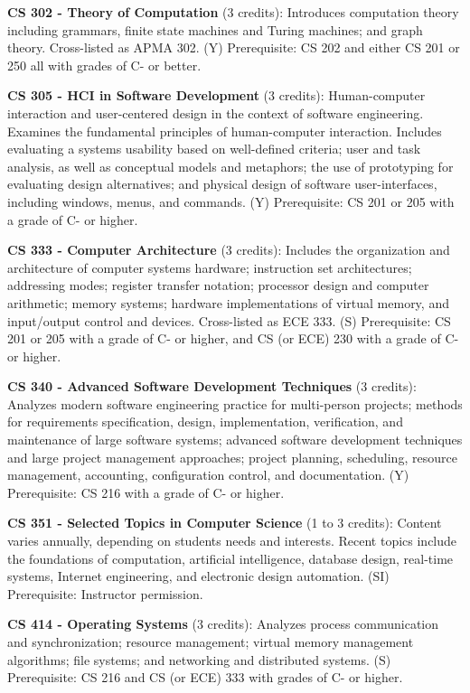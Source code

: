 \documentclass[12pt,twoside]{article}
\begin{document}
{\bf\noindent CS 302 - Theory of Computation} (3 credits): Introduces
computation theory including grammars, finite state machines and
Turing machines; and graph theory. Cross-listed as APMA 302. (Y)
Prerequisite: CS 202 and either CS 201 or 250 all with grades of C- or
better.

{\bf\noindent CS 305 - HCI in Software Development} (3 credits):
Human-computer interaction and user-centered design in the context of
software engineering. Examines the fundamental principles of
human-computer interaction. Includes evaluating a systems usability
based on well-defined criteria; user and task analysis, as well as
conceptual models and metaphors; the use of prototyping for evaluating
design alternatives; and physical design of software user-interfaces,
including windows, menus, and commands. (Y) Prerequisite: CS 201 or
205 with a grade of C- or higher.

{\bf\noindent CS 333 - Computer Architecture} (3 credits): Includes
the organization and architecture of computer systems hardware;
instruction set architectures; addressing modes; register transfer
notation; processor design and computer arithmetic; memory systems;
hardware implementations of virtual memory, and input/output control
and devices. Cross-listed as ECE 333. (S) Prerequisite: CS 201 or 205
with a grade of C- or higher, and CS (or ECE) 230 with a grade of C-
or higher.
     
{\bf\noindent CS 340 - Advanced Software Development Techniques} (3
credits): Analyzes modern software engineering practice for
multi-person projects; methods for requirements specification, design,
implementation, verification, and maintenance of large software
systems; advanced software development techniques and large project
management approaches; project planning, scheduling, resource
management, accounting, configuration control, and documentation. (Y)
Prerequisite: CS 216 with a grade of C- or higher.

{\bf\noindent CS 351 - Selected Topics in Computer Science} (1 to 3
credits): Content varies annually, depending on students needs
and interests. Recent topics include the foundations of computation,
artificial intelligence, database design, real-time systems, Internet
engineering, and electronic design automation. (SI) Prerequisite:
Instructor permission.

{\bf\noindent CS 414 - Operating Systems} (3 credits): Analyzes
process communication and synchronization; resource management;
virtual memory management algorithms; file systems; and networking and
distributed systems. (S) Prerequisite: CS 216 and CS (or ECE) 333 with
grades of C- or higher.
\end{document}
